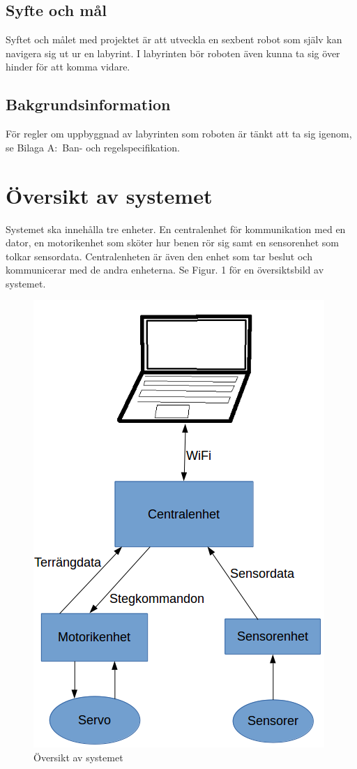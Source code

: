 \documentclass[a4paper,titlepage,12pt]{article}
\begin{document}
	\subsection{Syfte och mål}
	Syftet och målet med projektet är att utveckla en sexbent robot som själv
	kan navigera sig ut ur en labyrint. I labyrinten bör roboten även kunna ta 
	sig över hinder för att komma vidare. 
	\subsection{Bakgrundsinformation}
	För regler om uppbyggnad av labyrinten som roboten är tänkt att ta sig igenom, se
	Bilaga A:\ Ban- och regelspecifikation.


  \newpage
	\section{Översikt av systemet}
	Systemet ska innehålla tre enheter. En centralenhet för kommunikation med en dator, en motorikenhet
	som sköter hur benen rör sig samt en sensorenhet som tolkar sensordata. Centralenheten är även den enhet som
	tar beslut och kommunicerar med de andra enheterna. Se Figur. 1 för en översiktsbild av systemet.
	\begin{figure}[h]
		\centering
		\includegraphics[width=0.5\linewidth]{../images/overview.png}
		\caption{Översikt av systemet\label{fig:overview}}
	\end{figure}
\end{document}
